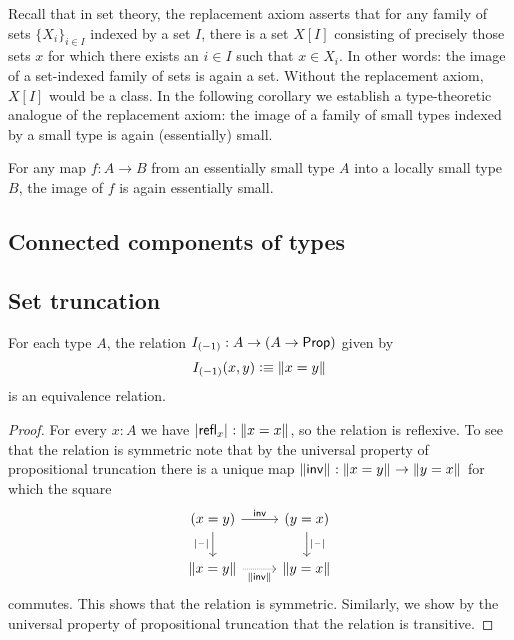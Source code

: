 Recall that in set theory, the replacement axiom asserts that for any family of sets $\{X_i\}_{i\in I}$ indexed by a set $I$, there is a set $X[I]$ consisting of precisely those sets $x$ for which there exists an $i\in I$ such that $x\in X_i$. In other words: the image of a set-indexed family of sets is again a set. Without the replacement axiom, $X[I]$ would be a class. In the following corollary we establish a type-theoretic analogue of the replacement axiom: the image of a family of small types indexed by a small type is again (essentially) small.

\begin{thm}\label{thm:replacement}
  For any map $f:A\to B$ from an essentially small type $A$ into a locally small type $B$, the image of $f$ is again essentially small.
\end{thm}

\subsection{Connected components of types}

\subsection{Set truncation}

\begin{lem}
For each type $A$, the relation $I_{(-1)}:A\to (A\to\mathsf{Prop})$ given by
\begin{equation*}
I_{(-1)}(x,y)\vcentcolon\equiv\Vert x=y\Vert_{}
\end{equation*}
is an equivalence relation.
\end{lem}

\begin{proof}
For every $x:A$ we have $\mathopen{}\left|\mathsf{refl}_{x}\right|_{}^{}\mathclose{}:\Vert x=x\Vert_{}$, so the relation is reflexive. To see that the relation is symmetric note that by the universal property of propositional truncation there is a unique map $\Vert \mathsf{inv}\Vert_{}:\Vert x=y\Vert_{}\to\Vert y=x\Vert_{}$ for which the square
\begin{equation*}
\begin{tikzcd}
(x=y) \arrow[r,"\invfunc"] \arrow[d,swap,"\bproj{\blank}"] & (y=x) \arrow[d,"\bproj{\blank}"] \\
\brck{x=y} \arrow[r,densely dotted,swap,"\brck{\invfunc}"] & \brck{y=x}
\end{tikzcd}
\end{equation*}
commutes. This shows that the relation is symmetric. Similarly, we show by the universal property of propositional truncation that the relation is transitive.
\end{proof}

